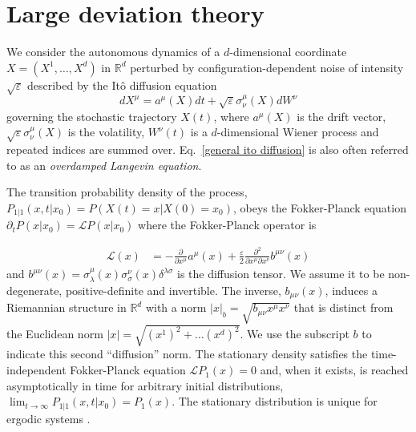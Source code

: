 \section{Large deviation theory} \label{sec:fwtheory}

We consider the autonomous dynamics of a $d$-dimensional coordinate
$X=(X^{1},\ldots,X^{d})$ in $\mathbb{R}^{d}$ perturbed by configuration-dependent
noise of intensity $\sqrt{\varepsilon}$ described by the Itô diffusion
equation \citep{oksendalStochasticDifferentialEquations2003, shreveStochasticCalculusFinance2005}
\begin{equation}
dX^{\mu}=a^{\mu}(X)dt+\sqrt{\varepsilon}\sigma_{\nu}^{\mu}(X)dW^{\nu}\label{general ito diffusion}
\end{equation}
governing the stochastic trajectory $X(t)$, where $a^{\mu}(X)$ is
the drift vector, $\sqrt{\varepsilon}\sigma_{\nu}^{\mu}(X)$ is the
volatility, $W^{\nu}(t)$ is a $d$-dimensional Wiener process and
repeated indices are summed over.  Eq.~\ref{general ito diffusion} is also often referred to as an \textit{overdamped Langevin equation}.

The transition probability density
of the process, $P_{1|1}(x,t|x_{0})=P(X(t)=x|X(0)=x_{0})$, obeys
the Fokker-Planck equation $\partial_{t}P(x|x_{0})=\mathcal{L}P(x|x_{0})$
where the Fokker-Planck operator is

\emph{
\begin{equation}
\begin{aligned}\mathcal{L}(x) & =-\frac{\partial}{\partial x^{\mu}}a^{\mu}(x)+\frac{\varepsilon}{2}\frac{\partial^{2}}{\partial x^{\mu}\partial x^{\nu}}b^{\mu\nu}(x)\end{aligned}
\label{eq:fokker-planck}
\end{equation}
}and \textbf{$b^{\mu\nu}(x)=\sigma_{\lambda}^{\mu}(x)\sigma_{\sigma}^{\nu}(x)\delta^{\lambda\sigma}$}
is the diffusion tensor. We assume it to be non-degenerate, positive-definite
and invertible. The inverse, $b_{\mu\nu}(x)$, induces a Riemannian
structure in $\mathbb{R}^{d}$ with a norm $|x|_{b}=\sqrt{b_{\mu\nu}x^{\mu}x^{\nu}}$
that is distinct from the Euclidean norm $|x|=\sqrt{(x^{1})^{2}+\ldots(x^{d})^{2}}.$
We use the subscript $b$ to indicate this second ``diffusion''
norm. The stationary density satisfies the time-independent Fokker-Planck
equation\emph{ }$\mathcal{L}P_{1}(x)=0$ and, when it exists, is reached
asymptotically in time for arbitrary initial distributions, $\lim_{t\rightarrow\infty}P_{1|1}(x,t|x_{0})=P_{1}(x)$.
The stationary distribution is unique for ergodic
systems \citep{pavliotis2014stochastic}. 

